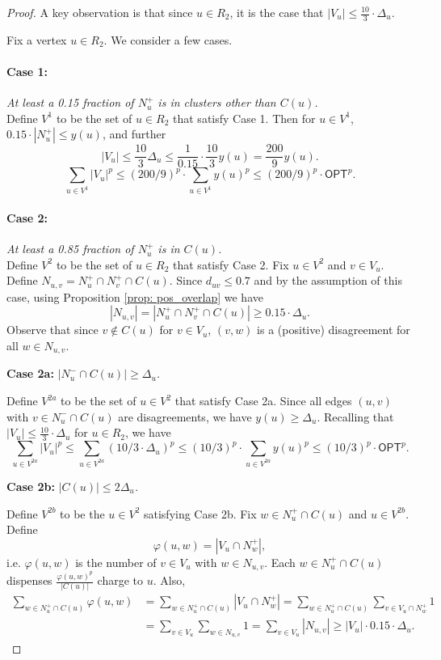 \begin{proof}
A key observation is that since $u \in R_2$, it is the case that $|V_u| \leq \frac{10}{3} \cdot \Delta_u$. 

\medskip 

Fix a vertex $u \in R_2$. We consider a few cases. 
\paragraph{Case 1: }\emph{At least a 0.15 fraction of $N_u^+$ is in clusters other than $C(u)$.}\\
Define $V^1$ to be the set of $u \in R_2$ that satisfy Case 1. Then for $u \in V^1$,  $0.15 \cdot |N_u^+| \leq y(u)$, and further
$$|V_u| \leq \frac{10}{3}\Delta_u \leq \frac{1}{0.15}\cdot \frac{10}{3} y(u) = \frac{200}{9}y(u).$$
$$ \boxed{\sum_{u \in V^1} |V_u|^p \leq (200/9)^p \cdot \sum_{u \in V^1} y(u)^p \leq (200/9)^p \cdot \textsf{OPT}^p.}$$

\paragraph{Case 2: }\emph{At least a 0.85 fraction of $N_u^+$ is in $C(u)$. }\\ 
Define $V^2$ to be the set of $u \in R_2$ that satisfy Case 2. 
Fix $u \in V^2$ and $v \in V_u$. Define $N_{u,v} = N_u^+ \cap N_v^+ \cap C(u)$. Since $d_{uv} \leq 0.7$ and by the assumption of this case, using Proposition \ref{prop: pos_overlap} we have  
$$|N_{u,v}| = |N_u^+ \cap N_v^+ \cap C(u)| \geq 0.15 \cdot \Delta_u.$$
Observe that since $v \not 
\in C(u)$ for $v \in V_u$, $(v,w)$ is a (positive) disagreement for all $w \in N_{u,v}$. 

\noindent  \textbf{Case 2a: }\emph{$|N_u^- \cap C(u)| \geq \Delta_u$.} 

    Define $V^{2a}$ to be the set of $u \in V^2$ that satisfy Case 2a. Since all edges $(u,v)$ with $v \in N_u^- \cap C(u)$ are disagreements, we have $y(u) \geq \Delta_u$. Recalling that $|V_u| \leq \frac{10}{3} \cdot \Delta_u$ for $u \in R_2$, we have
    \[\boxed{\sum_{u \in V^{2a}} |V_u|^p \leq \sum_{u \in V^{2a}} (10/3\cdot\Delta_u)^p \leq (10/3)^p \cdot \sum_{u \in V^{2a}} y(u)^p \leq (10/3)^p \cdot \textsf{OPT}^p.}\]

\noindent \textbf{Case 2b: }\emph{$|C(u)| \leq 2\Delta_u$.} 

    Define $V^{2b}$ to be the $u \in V^2$ satisfying Case 2b. 
    Fix $w \in N_u^+ \cap C(u)$ and $u \in V^{2b}$. Define 
    $$\varphi(u,w) = |V_u \cap N_w^+|,$$
    i.e. $\varphi(u,w)$ is the number of $v \in V_u$ with $w \in N_{u,v}$. 
    Each $w \in N_u^+ \cap C(u)$ dispenses 
    $\frac{\varphi(u,w)^p}{|C(u)|}$
    charge to $u$. Also, 
    \begin{align*}\sum_{w \in N_u^+ \cap C(u)} \varphi(u,w) &= 
    \sum_{w \in N_u^+ \cap C(u)} |V_u \cap N_w^+|
    = \sum_{w \in N_u^+ \cap C(u)} \sum_{v \in V_u\cap N_w^+}1 \\
    &= \sum_{v \in V_u} \sum_{w \in N_{u,v}}1 
    =\sum_{v \in V_u}  |N_{u,v}| \geq |V_u| \cdot 0.15 \cdot \Delta_u.
    \end{align*}
    

\end{proof}
